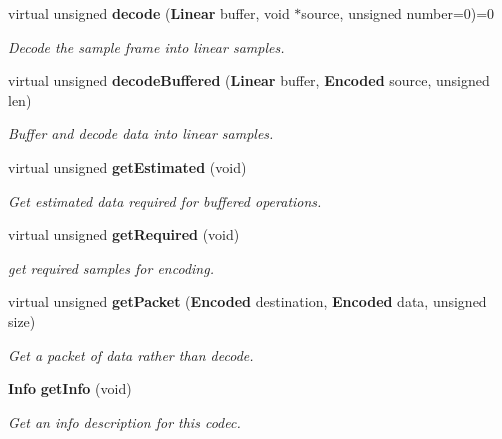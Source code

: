 \begin{DoxyCompactItemize}
virtual unsigned {\bf decode} ({\bf Linear} buffer, void $\ast$source, unsigned number=0)=0
\begin{DoxyCompactList}\small\item\em Decode the sample frame into linear samples. \item\end{DoxyCompactList}\item 
virtual unsigned {\bf decodeBuffered} ({\bf Linear} buffer, {\bf Encoded} source, unsigned len)
\begin{DoxyCompactList}\small\item\em Buffer and decode data into linear samples. \item\end{DoxyCompactList}\item 
virtual unsigned {\bf getEstimated} (void)
\begin{DoxyCompactList}\small\item\em Get estimated data required for buffered operations. \item\end{DoxyCompactList}\item 
virtual unsigned {\bf getRequired} (void)
\begin{DoxyCompactList}\small\item\em get required samples for encoding. \item\end{DoxyCompactList}\item 
virtual unsigned {\bf getPacket} ({\bf Encoded} destination, {\bf Encoded} data, unsigned size)
\begin{DoxyCompactList}\small\item\em Get a packet of data rather than decode. \item\end{DoxyCompactList}\item 
{\bf Info} {\bf getInfo} (void)
\begin{DoxyCompactList}\small\item\em Get an info description for this codec. \item\end{DoxyCompactList}\end{DoxyCompactItemize}
